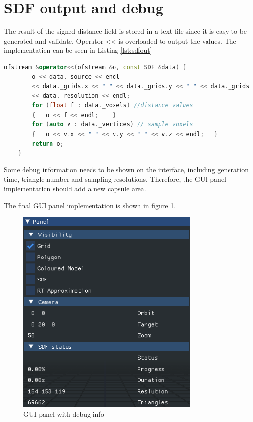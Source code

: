 \clearpage

\section{SDF output and debug}

The result of the signed distance field is stored in a text file since it is easy to be generated and validate. Operator << is overloaded to 
output the values. The implementation can be seen in Listing \ref{lst:sdfout}

\begin{lstlisting}[language=C++, label={lst:sdfout}, caption = SDF output function]
    ofstream &operator<<(ofstream &o, const SDF &data) {
        o << data._source << endl
        << data._grids.x << " " << data._grids.y << " " << data._grids.z << endl
        << data._resolution << endl;
        for (float f : data._voxels) //distance values
        {   o << f << endl;    }
        for (auto v : data._vertices) // sample voxels
        {   o << v.x << " " << v.y << " " << v.z << endl;   }
        return o;
    }
\end{lstlisting}

Some debug information needs to be shown on the interface, including generation time, triangle number and sampling resolutions. Therefore, the GUI panel implementation should add a new capsule area.

\hspace*{\fill}

The final GUI panel implementation is shown in figure \ref{impl:guidebug}.

\begin{figure}[htbp]
    \centering
    \includegraphics[width=9cm]{Images/Chap4/guidebug.png}
    \caption{GUI panel with debug info}
    \label{impl:guidebug}
\end{figure}

